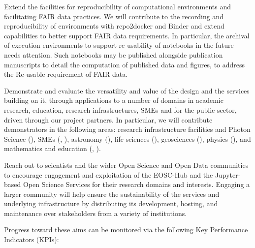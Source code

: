 \begin{compactenum}
\item \label{obj:reusability} %
  Extend the facilities for reproducibility of computational environments
  and facilitating FAIR data practices.
  We will contribute to the recording and reproducibility
  of environments with repo2docker and Binder
  and extend capabilities to better support FAIR
  data requirements. In particular, the archival of execution
  environments to support re-usability of notebooks in the future
  needs attention. Such notebooks may be published alongside
  publication manuscripts to detail the computation of published data
  and figures, to address the Re-usable requirement of FAIR data.

\item \label{obj:demonstrators} %
  Demonstrate and evaluate the  versatility and value of the design and
  the services building on it, through applications to a number of
  domains in academic research, education, research infrastructures, SMEs and for
  the public sector, driven through our project partners. In
  particular, we will contribute demonstrators in the following areas: research infrastructure facilities and
  Photon Science (), SMEs (, ),
  astronomy (), life sciences (),
  geosciences (), physics (),
  and mathematics and education (, ).

\item \label{obj:outreach-and-engagement} %
  Reach out to scientists and the wider Open Science and Open Data
  communities to encourage engagement
  and exploitation of the EOSC-Hub and the Jupyter-based Open Science
  Services for their research domains and interests.
  Engaging a larger community will help ensure the sustainability of
  the services and underlying infrastructure by distributing its
  development, hosting, and maintenance over stakeholders from a
  variety of institutions.

\end{compactenum}

\noindent Progress toward these aims can be monitored via the following
Key Performance Indicators (KPIs):

